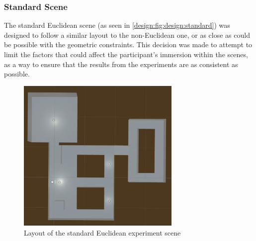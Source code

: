 		\subsubsection{Standard Scene}
			The standard Euclidean scene (as seen in \autoref{design:fig:design:standard}) was designed to follow a similar layout to the non-Euclidean one, or as close as could be possible with the geometric constraints.
			This decision was made to attempt to limit the factors that could affect the participant's immersion within the scenes, as a way to ensure that the results from the experiments are as consistent as possible.

			\begin{figure}[h]
				\includegraphics[width=0.7\textwidth]{Images/Standard_Layout}
				\centering
				\caption{Layout of the standard Euclidean experiment scene}
				\label{design:fig:design:standard}
			\end{figure}
